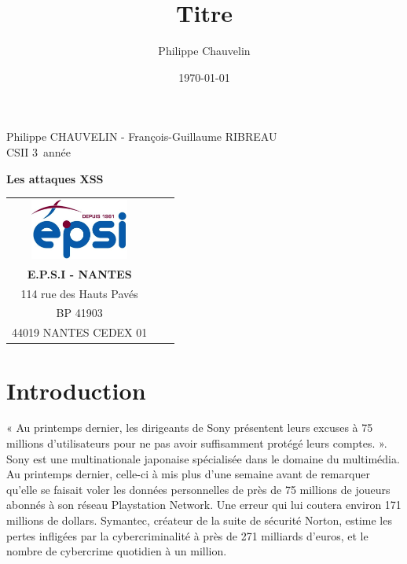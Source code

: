 \documentclass[a4paper,12pt]{report}
\title{Titre}
\author{Philippe Chauvelin}
\date{\today}
\begin{document}
	\begin{titlepage}
		\begin{center}
			Philippe CHAUVELIN - François-Guillaume RIBREAU\\
			CSII 3\ieme~année\\
		\end{center}
		\hrulefill
		\vspace{7cm}
		\begin{center} 
			\LARGE \textbf{Les attaques XSS}\\
			\vspace{6cm}
		
			\begin{tabular}{cp{4cm}c}
				\includegraphics[height=75px]{images/logo_epsi.jpg}\\
				\textbf{E.P.S.I - NANTES}\\
				114 rue des Hauts Pavés\\
				BP 41903\\
				44019 NANTES CEDEX 01\\
			\end{tabular}
		\end{center}
	\end{titlepage}
	\newpage
	
	\newpage
	\null
	\thispagestyle{empty}
	\setcounter{page}{0}
	\newpage
	
	
	\setcounter{page}{1}
	\thispagestyle{empty}
	\newpage
	
	\chapter*{Introduction} %
		\setcounter{section}{1}
		
		
« Au printemps dernier, les dirigeants de Sony présentent leurs excuses à 75 millions d'utilisateurs pour ne pas avoir suffisamment protégé leurs comptes. ».\\

Sony est une multinationale japonaise spécialisée dans le domaine du multimédia. Au printemps dernier, celle-ci à mis plus d'une semaine avant de remarquer qu'elle se faisait voler les données personnelles de près de 75 millions de joueurs abonnés à son réseau Playstation Network. Une erreur qui lui coutera environ 171 millions de dollars. Symantec, créateur de la suite de sécurité Norton, estime les pertes infligées par la cybercriminalité à près de 271 milliards d'euros, et le nombre de cybercrime quotidien à un million.\\
\end{document}
